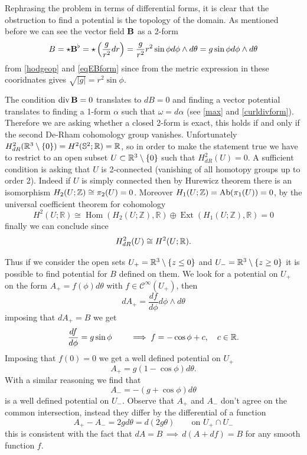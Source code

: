 \documentclass{article}
\theoremstyle{definition}
\theoremstyle{remark}
\begin{document}
Rephrasing the problem in terms of differential forms, it is clear that the obstruction to find a potential is the topology of the domain. As mentioned before we can see the vector field \(\mathbf{B}\) as a 2-form
\[B = \star\mathbf{B}^\flat = \star \left( \frac{g}{r^2}dr \right) = \frac{g}{r^2}r^2\sin\phi d\phi\wedge d\theta = g\sin\phi d\phi\wedge d\theta\]
from \ref{hodgeop} and \ref{eqEBform} since from the metric expression in these cooridnates gives \(\sqrt{|g|}=r^2\sin\phi\).

The condition \(\operatorname{div}\mathbf{B} =0\) translates to \(dB=0\) and finding a vector potential translates to finding a 1-form \(\alpha\) such that \(\omega =d\alpha\) (see \ref{max} and \ref{curldivform}). Therefore we are asking whether a closed 2-form is exact, this holds if and only if the second De-Rham cohomology group vanishes. Unfortunately \(H^2_{dR}(\mathbb{R}^3\setminus\{0\})=H^2(\mathbb{S}^2;\mathbb{R})=\mathbb{R}\), so in order to make the statement true we have to restrict to an open subset \(U\subset\mathbb{R}^3\setminus\{0\}\) such that \(H^2_{dR}(U)=0\). A sufficient condition is asking that \(U\) is 2-connected (vanishing of all homotopy groups up to order 2). Indeed if \(U\) is simply connected then by Hurewicz theorem there is an isomorphism \(H_2(U;\mathbb{Z})\cong \pi_2(U)=0\). Moreover \(H_1(U;\mathbb{Z})=\operatorname{Ab}(\pi_1(U))=0\), by the universal coefficient theorem for cohomology
\[H^2(U; \mathbb{R}) \cong \operatorname{Hom}(H_2(U; \mathbb{Z}), \mathbb{R}) \oplus \operatorname{Ext}(H_1(U; \mathbb{Z}), \mathbb{R})=0\]
finally we can conclude since 
\[H^2_{dR}(U)\cong H^2(U;\mathbb{R}).\]

Thus if we consider the open sets \( U_+ = \mathbb{R}^3\setminus\{z\leq 0\} \) and \( U_- = \mathbb{R}^3\setminus\{z\geq 0\} \) it is possible to find potential for \(B\) defined on them.
We look for a potential on \(U_+\) on the form \(A_+=f(\phi)d\theta\) with \(f\in\mathcal{C}^\infty(U_+)\), then
\[ dA_+ = \frac{df}{d\phi} d\phi\wedge d\theta\]
imposing that \(dA_+=B\) we get
\[\frac{df}{d\phi}=g\sin\phi \qquad \implies f=-\cos\phi + c, \quad c\in\mathbb{R}.\] 
Imposing that \(f(0)=0\) we get a well defined potential on \(U_+\)
\begin{equation}\label{A+}
    A_+=g(1-\cos\phi)d\theta.
\end{equation}
With a similar reasoning we find that 
\begin{equation}\label{A-}
    A_-=-(g+\cos\phi)d\theta
\end{equation}
is a well defined potential on \(U_-\).
Observe that \(A_+\) and \(A_-\) don't agree on the common intersection, instead they differ by the differential of a function
\[A_+-A_-=2gd\theta=d(2g\theta) \qquad \text{on } U_+\cap U_-\]
this is consistent with the fact that \(dA=B \, \implies \, d(A+df)=B \) for any smooth function \(f\).
\end{document}
